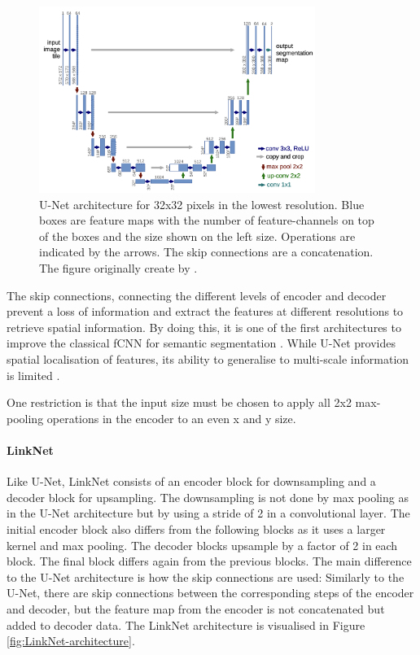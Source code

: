 \begin{figure}[htb!]
	\centering
	\includegraphics[width=0.8\textwidth]{fig/unet-architecture.png}
	\caption{U-Net architecture for 32x32 pixels in the lowest resolution. Blue boxes are feature maps with the number of feature-channels on top of the boxes and the size shown on the left size. Operations are indicated by the arrows. The skip connections are a concatenation. The figure originally create by \citeauthor{unet} \cite{unet}.}
	\label{fig:unet-architecture}
\end{figure}

The skip connections, connecting the different levels of encoder and decoder prevent a loss of information and extract the features at different resolutions to retrieve spatial information. By doing this, it is one of the first architectures to improve the classical fCNN for semantic segmentation \cite{Litjens2017}. While U-Net provides spatial localisation of features, its ability to generalise to multi-scale information is limited \cite{Norelyaqine2023}.

One restriction is that the input size must be chosen to apply all 2x2 max-pooling operations in the encoder to an even x and y size.


\paragraph{LinkNet}

Like U-Net, LinkNet consists of an encoder block for downsampling and a decoder block for upsampling. The downsampling is not done by max pooling as in the U-Net architecture but by using a stride of 2 in a convolutional layer. The initial encoder block also differs from the following blocks as it uses a larger kernel and max pooling. The decoder blocks upsample by a factor of 2 in each block. The final block differs again from the previous blocks. The main difference to the U-Net architecture is how the skip connections are used: Similarly to the U-Net, there are skip connections between the corresponding steps of the encoder and decoder, but the feature map from the encoder is not concatenated but added to decoder data. The LinkNet architecture is visualised in Figure \ref{fig:LinkNet-architecture}. \cite{LinkNet}

